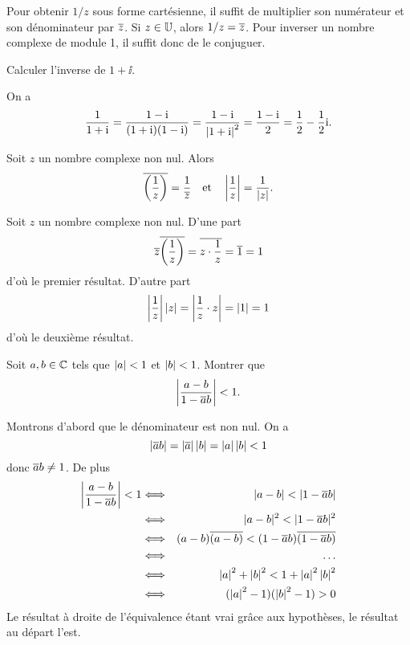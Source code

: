 \documentclass{magnoliaold}
\begin{document}
\begin{remarques}
\remarque Pour obtenir $1/z$ sous forme cartésienne, il suffit de multiplier son
  numérateur et son dénominateur par $\overline{z}$.
\remarque Si $z\in\U$, alors $1/z=\overline{z}$. Pour inverser un nombre complexe de module 1, il suffit donc de le conjuguer.
\end{remarques}

\begin{exoUnique}
\exo Calculer l'inverse de $1+\ii$.
  \begin{sol}
  On a
  \[\frac{1}{1+{\rm i}}=\frac{1-{\rm i}}{(1+{\rm i})(1-{\rm i})}=\frac{1-{\rm i}}{\left|1+{\rm i}\right|^2}=\frac{1-{\rm i}}{2}=\frac{1}{2}-\frac{1}{2}{\rm i}.\]
  \end{sol}
\end{exoUnique}

\begin{proposition}
  Soit $z$ un nombre complexe non nul. Alors
  $$\overline{\left(\frac{1}{z}\right)}=\frac{1}{\overline{z}} \quad \text{et} \quad
    \left|\frac{1}{z}\right|=\frac{1}{\left|z\right|}.$$
\end{proposition}

\begin{preuve}
Soit $z$ un nombre complexe non nul. D'une part
\[\overline{z}\overline{\left(\frac{1}{z}\right)}=\overline{z\cdot\frac{1}{z}}=\overline{1}=1\]
d'où le premier résultat. D'autre part
\[\left|\frac{1}{z}\right|\left|z\right|=\left|\frac{1}{z}\cdot z\right|=\left|1\right|=1\]
d'où le deuxième résultat.
\end{preuve}

\begin{exoUnique}
\exo Soit $a,b\in\mathbb{C}$ tels que $\left|a\right|<1$ et $\left|b\right|<1$. Montrer que
  \[\left|\frac{a-b}{1-\overline{a}b}\right|<1.\]
\begin{sol}
Montrons d'abord que le dénominateur est non nul. On a
\[\left|\overline{a}b\right|=\left|\overline{a}\right|\left|b\right|=\left|a\right|\left|b\right|<1\]
donc $\overline{a}b\neq 1$. De plus
 \begin{eqnarray*}
 \abs{\frac{a-b}{1-\conj{a}b}}<1&\Longleftrightarrow &|a-b|<|1-\conj{a}b|\\
 &\Longleftrightarrow & |a-b|^2<|1-\conj{a}b|^2\\
 &\Longleftrightarrow & (a-b)\conj{(a-b)}<(1-\conj{a}b)\conj{(1-\conj{a}b)}\\
 &\Longleftrightarrow & \ldots \\
 &\Longleftrightarrow & \abs{a}^2+\abs{b}^2<1+\abs{a}^2\abs{b}^2 \\
 &\Longleftrightarrow & (\abs{a}^2-1)(\abs{b}^2-1)>0
 \end{eqnarray*}
  Le résultat à droite de l'équivalence étant vrai grâce aux hypothèses, le résultat au départ l'est.
  \end{sol}
\end{exoUnique}
\end{document}
